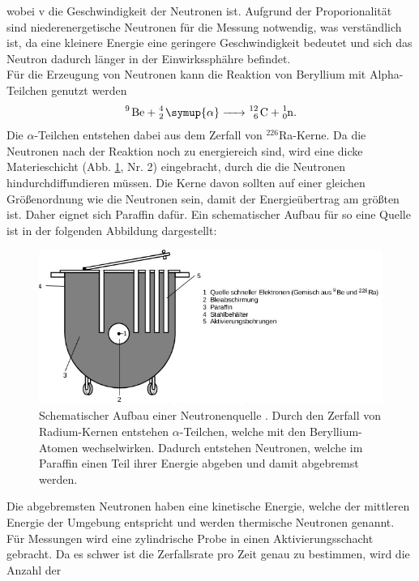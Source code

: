 wobei v die Geschwindigkeit der Neutronen ist.
Aufgrund der Proporionalität sind niederenergetische Neutronen für die Messung notwendig,
was verständlich ist, da eine kleinere Energie eine geringere Geschwindigkeit bedeutet
und sich das Neutron dadurch länger in der Einwirkssphähre befindet.\\
Für die Erzeugung von Neutronen kann die Reaktion von Beryllium mit 
Alpha-Teilchen genutzt werden \cite{V702}
\begin{align}
    \ce{ ^9 Be + _2^4 \symup{\alpha} -> _6^{12} C + _0^1n }. \label{eq:4}
\end{align}
Die $\alpha$-Teilchen entstehen dabei aus dem Zerfall von $^{226} $Ra-Kerne.
Da die Neutronen nach der Reaktion noch zu energiereich sind, wird eine dicke Materieschicht (Abb. \ref{fig:1}, Nr. 2) eingebracht,
durch die die Neutronen hindurchdiffundieren müssen. Die Kerne davon sollten auf
einer gleichen Größenordnung wie die Neutronen sein, damit der Energieübertrag am größten ist.
Daher eignet sich Paraffin dafür. Ein schematischer Aufbau für so eine Quelle ist in der folgenden Abbildung
dargestellt:
\begin{figure}[H]
    \centering
    \includegraphics[width=\linewidth]{images/neutron_quelle.jpg}
    \caption{Schematischer Aufbau einer Neutronenquelle \cite{V702}.
    Durch den Zerfall von Radium-Kernen entstehen $\alpha$-Teilchen,
    welche mit den Beryllium-Atomen wechselwirken. Dadurch entstehen Neutronen,
    welche im Paraffin einen Teil ihrer Energie abgeben und damit abgebremst werden.
    }
    \label{fig:1}
\end{figure}
Die abgebremsten Neutronen haben eine kinetische Energie, welche der mittleren Energie der Umgebung entspricht und
werden thermische Neutronen genannt.\\
Für Messungen wird eine zylindrische Probe in einen Aktivierungsschacht gebracht.
Da es schwer ist die Zerfallsrate pro Zeit genau zu bestimmen, wird die Anzahl der 
